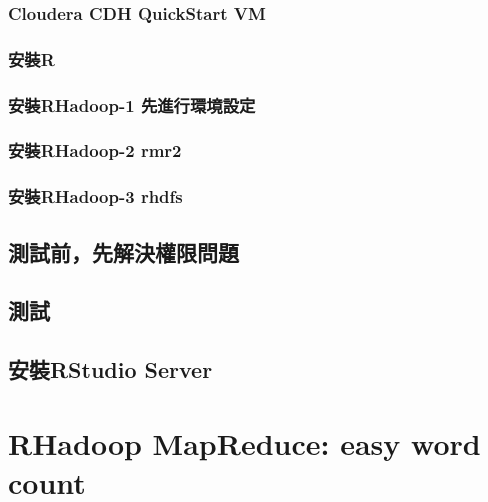 \documentclass[
]{book}
\begin{document}
\hypertarget{cloudera-cdh-quickstart-vm}{%
\subsubsection{Cloudera CDH QuickStart VM}\label{cloudera-cdh-quickstart-vm}}

\hypertarget{ux5b89ux88ddr}{%
\subsubsection{安裝R}\label{ux5b89ux88ddr}}

\hypertarget{ux5b89ux88ddrhadoop-1-ux5148ux9032ux884cux74b0ux5883ux8a2dux5b9a}{%
\subsubsection{安裝RHadoop-1 先進行環境設定}\label{ux5b89ux88ddrhadoop-1-ux5148ux9032ux884cux74b0ux5883ux8a2dux5b9a}}

\hypertarget{ux5b89ux88ddrhadoop-2-rmr2}{%
\subsubsection{安裝RHadoop-2 rmr2}\label{ux5b89ux88ddrhadoop-2-rmr2}}

\hypertarget{ux5b89ux88ddrhadoop-3-rhdfs}{%
\subsubsection{安裝RHadoop-3 rhdfs}\label{ux5b89ux88ddrhadoop-3-rhdfs}}

\hypertarget{ux6e2cux8a66ux524dux5148ux89e3ux6c7aux6b0aux9650ux554fux984c}{%
\subsection{測試前，先解決權限問題}\label{ux6e2cux8a66ux524dux5148ux89e3ux6c7aux6b0aux9650ux554fux984c}}

\hypertarget{ux6e2cux8a66}{%
\subsection{測試}\label{ux6e2cux8a66}}

\hypertarget{ux5b89ux88ddrstudio-server}{%
\subsection{安裝RStudio Server}\label{ux5b89ux88ddrstudio-server}}

\hypertarget{rhadoop-mapreduce-easy-word-count}{%
\section{RHadoop MapReduce: easy word count}\label{rhadoop-mapreduce-easy-word-count}}
\end{document}
